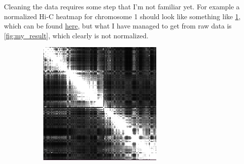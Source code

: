 \documentclass{article}
\begin{document}
Cleaning the data requires some step that I'm not familiar yet. For example a normalized
Hi-C heatmap for chromosome 1 should look like something like \ref{fig:normalized_heatmap},
which can be found 
\href{http://sysbio.rnet.missouri.edu/T0510/tmp_download/link_to_download_genome_data/}{here},
but what I have managed to get from raw data is \ref{fig:my_result}, which clearly is
not normalized.
\begin{figure}[H]
    \centering
        \begin{subfigure}[b]{.4\textwidth}
            \includegraphics[width=\textwidth]{figures/normalized_heatmap.png}
            \caption{}
            \label{fig:normalized_heatmap}
        \end{subfigure}
        \begin{subfigure}[b]{.4\textwidth}

\end{subfigure}
\end{figure}
\end{document}
